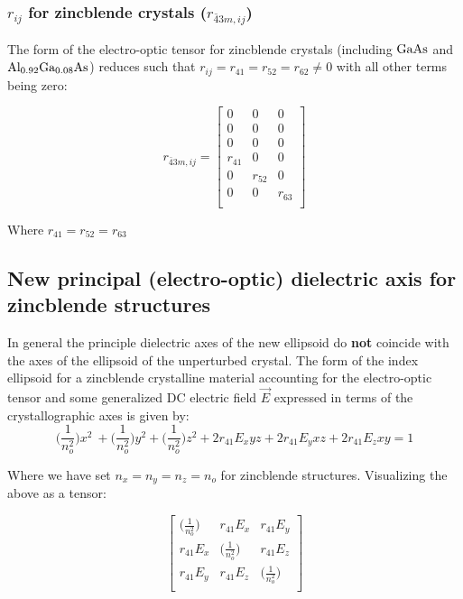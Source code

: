 
\subsubsection{\texorpdfstring{$r_{ij}$}{rij} for zincblende crystals (\texorpdfstring{$r_{\bar{4}3m, ij}$}{r43})}

The form of the electro-optic tensor for zincblende crystals (including $\mathrm{GaAs}$ and $\mathrm{Al_{0.92}Ga_{0.08}As}$) reduces such that $r_{ij} = r_{41} = r_{52} = r_{62} \neq 0$ with all other terms being zero:

\begin{equation}
r_{\bar{4}3m,ij} =
 \left[ {\begin{array}{ccc}
  0 & 0 & 0\\
  0 & 0 & 0\\
  0 & 0 & 0\\
  r_{41} & 0 & 0\\
  0 & r_{52} & 0\\
  0 & 0 & r_{63}\\
 \end{array}} \right]
\end{equation}

\noindent Where $r_{41} = r_{52} = r_{63}$

\subsection{New principal (electro-optic) dielectric axis for zincblende structures}
In general the principle dielectric axes of the new ellipsoid do \textbf{not} coincide with the axes of the ellipsoid of the unperturbed crystal. The form of the index ellipsoid for a zincblende crystalline material accounting for the electro-optic tensor and some generalized DC electric field $\vec{E}$ expressed in terms of the crystallographic axes is given by:
\begin{equation}\label{eq:zindicatrix}
\bigg(\frac{1}{n_o^2} \bigg) x^2\ + \bigg(\frac{1}{n_o^2} \bigg) y^2 + \bigg(\frac{1}{n_o^2} \bigg) z^2  + 2r_{41} E_{x} yz + 2r_{41} E_{y} xz + 2r_{41}E_{z} xy= 1
\end{equation}

\noindent Where we have set $n_x = n_y = n_z = n_o$ for zincblende structures. Visualizing the above as a tensor:

\begin{equation}
\left[ {\begin{array}{ccc}
   \big( \frac{1}{n_o ^2} \big)& r_{41}E_{x} & r_{41} E_{y}\\
   r_{41}E_{x} & \big( \frac{1}{n_o ^2} \big) & r_{41} E_{z}\\
   r_{41} E_{y} & r_{41} E_{z} & \big( \frac{1}{n_o ^2} \big)\\
\end{array}} \right]
\end{equation}

